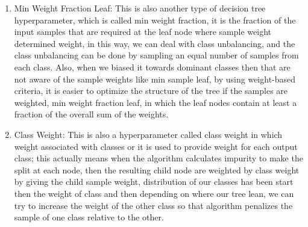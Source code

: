 \begin{enumerate}
        \item Min Weight Fraction Leaf: This is also another type of decision tree hyperparameter, which is called min weight fraction, it is the fraction of the input samples that are required at the leaf node where sample weight determined weight, in this way, we can deal with class unbalancing, and the class unbalancing can be done by sampling an equal number of samples from each class. Also, when we biased it towards dominant classes then that are not aware of the sample weights like min sample leaf, by using weight-based criteria, it is easier to optimize the structure of the tree if the samples are weighted, min weight fraction leaf, in which the leaf nodes contain at least a fraction of the overall sum of the weights.
        \item Class Weight: This is also a hyperparameter called class weight in which weight associated with classes or it is used to provide weight for each output class; this actually means when the algorithm calculates impurity to make the split at each node, then the resulting child node are weighted by class weight by giving the child sample weight, distribution of our classes has been start then the weight of class and then depending on where our tree lean, we can try to increase the weight of the other class so that algorithm penalizes the sample of one class relative to the other.
    \end{enumerate}